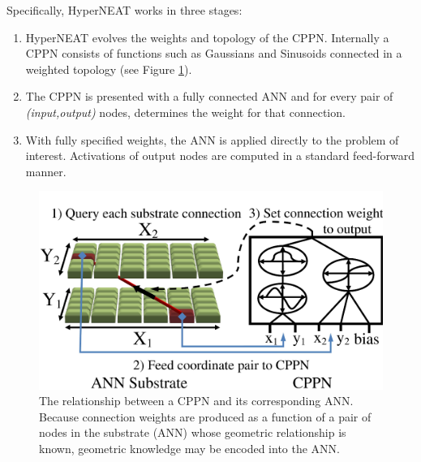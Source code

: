 \documentclass{acm_proc_article-sp}
\begin{document}
Specifically, HyperNEAT works in three stages:

\begin{enumerate}
\item HyperNEAT evolves the weights and topology of the CPPN. Internally a CPPN consists of functions such as Gaussians and Sinusoids connected in a weighted topology (see Figure \ref{fig:cppn}).
\item The CPPN is presented with a fully connected ANN and for every pair of \emph{(input,output)} nodes, determines the weight for that connection.
\item With fully specified weights, the ANN is applied directly to the problem of interest. Activations of output nodes are computed in a standard feed-forward manner.
\end{enumerate}



\begin{figure}[htp]
\begin{center}
\includegraphics[width=\columnwidth]{figures/cppn}
\end{center}
\caption{The relationship between a CPPN and its corresponding ANN. Because connection weights are produced as a function of a pair of nodes in the substrate (ANN) whose geometric relationship is known, geometric knowledge may be encoded into the ANN.}
\label{fig:cppn}
\end{figure}
\end{document}
